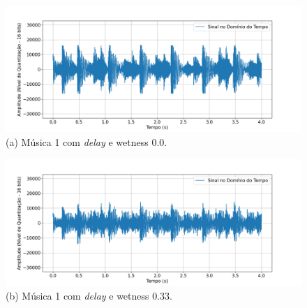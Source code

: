 \begin{figure}[htpb]
    \centering
    \begin{minipage}[b]{0.7\textwidth}
        \centering
        \includegraphics[width=\textwidth]{figuras/fig89.png}
        \vspace{0.3cm} %
        (a) Música 1 com \textit{delay} e wetness 0.0.
    \end{minipage}
    \hspace{0.5cm} %

    \begin{minipage}[b]{0.7\textwidth}
        \centering
        \includegraphics[width=\textwidth]{figuras/fig90.png}
        \vspace{0.3cm} %
        (b) Música 1 com \textit{delay} e wetness 0.33.
    \end{minipage}
    
    \vspace{0.5cm} %


\end{figure}
